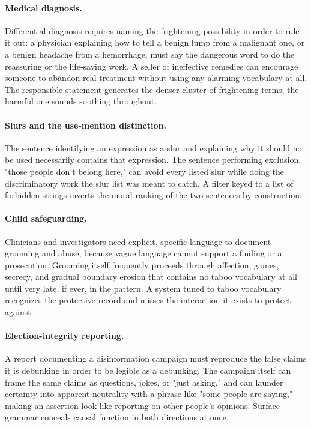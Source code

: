 \documentclass[11pt]{article}
\begin{document}
\paragraph{Medical diagnosis.} Differential diagnosis requires naming the frightening possibility in order to rule it out: a physician explaining how to tell a benign lump from a malignant one, or a benign headache from a hemorrhage, must say the dangerous word to do the reassuring or the life-saving work. A seller of ineffective remedies can encourage someone to abandon real treatment without using any alarming vocabulary at all. The responsible statement generates the denser cluster of frightening terms; the harmful one sounds soothing throughout.

\paragraph{Slurs and the use-mention distinction.} The sentence identifying an expression as a slur and explaining why it should not be used necessarily contains that expression. The sentence performing exclusion, "those people don't belong here," can avoid every listed slur while doing the discriminatory work the slur list was meant to catch. A filter keyed to a list of forbidden strings inverts the moral ranking of the two sentences by construction.

\paragraph{Child safeguarding.} Clinicians and investigators need explicit, specific language to document grooming and abuse, because vague language cannot support a finding or a prosecution. Grooming itself frequently proceeds through affection, games, secrecy, and gradual boundary erosion that contains no taboo vocabulary at all until very late, if ever, in the pattern. A system tuned to taboo vocabulary recognizes the protective record and misses the interaction it exists to protect against.

\paragraph{Election-integrity reporting.} A report documenting a disinformation campaign must reproduce the false claims it is debunking in order to be legible as a debunking. The campaign itself can frame the same claims as questions, jokes, or "just asking," and can launder certainty into apparent neutrality with a phrase like "some people are saying," making an assertion look like reporting on other people's opinions. Surface grammar conceals causal function in both directions at once.
\end{document}
